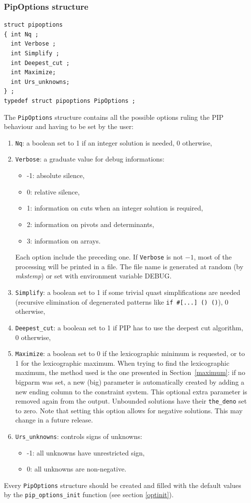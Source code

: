 \documentclass[12pt,a4paper]{article}
\begin{document}
\subsubsection{PipOptions structure}
\begin{verbatim}
struct pipoptions
{ int Nq ;
  int Verbose ;
  int Simplify ;
  int Deepest_cut ;
  int Maximize;
  int Urs_unknowns;
} ;      
typedef struct pipoptions PipOptions ;
\end{verbatim}
The {\tt PipOptions} structure contains all the possible options ruling
the PIP behaviour and having to be set by the user: 
\begin{enumerate}
\item {\tt Nq}: a boolean set to 1 if an integer solution is needed, 0
      otherwise,
\item {\tt Verbose}: a graduate value for debug informations:
      \begin{itemize}
      \item -1: absolute silence,
      \item 0: relative silence,
      \item 1: information on cuts when an integer solution is required,
      \item 2: information on pivots and determinants,
      \item 3: information on arrays.
      \end{itemize}
      Each option include the preceding one.
      If {\tt Verbose} is not $-1$, most of the processing will be printed in
      a file. The file name is generated at random (by \textit{mkstemp}) or
      set with environment variable DEBUG.
\item {\tt Simplify}: a boolean set to 1 if some trivial quast simplifications
      are needed (recursive elimination of degenerated patterns like
      {\tt if \#[...] () ()}), 0 otherwise,
\item {\tt Deepest\_cut}: a boolean set to 1 if PIP has to use the deepest cut
      algorithm, 0 otherwise,
\item {\tt Maximize}: a boolean set to 0 if the lexicographic
      minimum is requested, or to 1 for the lexicographic maximum. When trying to
      find the lexicographic maximum, the method used is the one
      presented in Section~\ref{maximum}: if no bigparm was set, a new (big)
      parameter is automatically created by adding a new ending column to the
      constraint system.  This optional extra parameter is removed again from the
      output.  Unbounded solutions have their \verb+the_deno+ set to zero.
      Note that setting this option allows for negative solutions.
      This may change in a future release.
\item \verb+Urs_unknowns+: controls signs of unknowns:
	\begin{itemize}
	\item -1: all unknowns have unrestricted sign,
	\item 0: all unknowns are non-negative.
        \end{itemize}
\end{enumerate}
Every {\tt PipOptions} structure should be created and filled with the default
values by the {\tt pip\_options\_init} function (see section \ref{optinit}).
\end{document}
